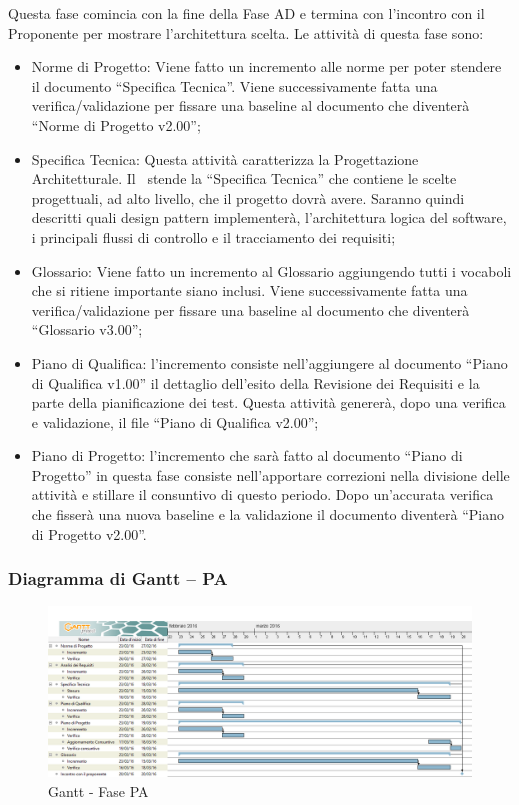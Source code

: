 \documentclass[../PianoProgetto.tex]{subfiles}
\begin{document}
		Questa fase comincia con la fine della Fase AD e termina con l’incontro con il Proponente per mostrare l’architettura scelta. Le attività di questa fase sono:
		\begin{itemize}
			\item Norme di Progetto: Viene fatto un incremento alle norme per poter stendere il documento “Specifica Tecnica”. Viene successivamente fatta una verifica/validazione per fissare una baseline al documento che diventerà “Norme di Progetto v2.00”;

			\item Specifica Tecnica: Questa attività caratterizza la Progettazione Architetturale. Il \progettista\ stende la “Specifica Tecnica” che contiene le scelte progettuali, ad alto livello, che il progetto dovrà avere. Saranno quindi descritti quali design pattern implementerà, l’architettura logica del software, i principali flussi di controllo e il tracciamento dei requisiti;

			\item Glossario: Viene fatto un incremento al Glossario aggiungendo tutti i vocaboli che si ritiene importante siano inclusi. Viene successivamente fatta una verifica/validazione per fissare una baseline al documento che diventerà “Glossario v3.00”;

 			\item Piano di Qualifica: l’incremento consiste nell’aggiungere al documento “Piano di Qualifica v1.00” il dettaglio dell’esito della Revisione dei Requisiti e la parte della pianificazione dei test. Questa attività genererà, dopo una verifica e validazione, il file “Piano di Qualifica v2.00”;

			\item Piano di Progetto: l’incremento che sarà fatto al documento “Piano di Progetto” in questa fase consiste nell’apportare correzioni nella divisione delle attività e stillare il consuntivo di questo periodo. Dopo un’accurata verifica che fisserà una nuova baseline e la validazione il documento diventerà “Piano di Progetto v2.00”.
		\end{itemize}
		
		\subsubsection{Diagramma di Gantt – PA}
			\begin{figure}[!h]
				\centering
				\includegraphics[width=\textwidth]{gantt_png/3-progettazione_architetturale}
				\caption{Gantt - Fase PA}
				\label{fig:Gantt - Fase PA}
			\end{figure}
						
\end{document}
